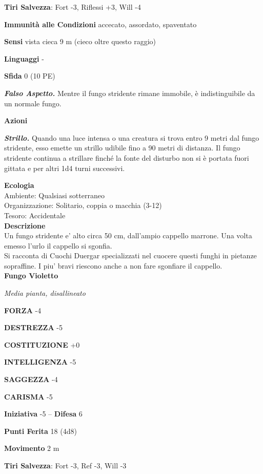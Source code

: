 \begin{multicols}{2}
\textbf{Tiri Salvezza}: Fort -3, Riflessi +3, Will -4

\textbf{Immunità alle Condizioni} accecato, assordato, spaventato

\textbf{Sensi} vista cieca 9 m (cieco oltre questo raggio)

\textbf{Linguaggi} -

\textbf{Sfida} 0 (10 PE)

\emph{\textbf{Falso Aspetto.}} Mentre il fungo stridente rimane immobile, è indistinguibile da un normale fungo.

\textbf{Azioni}

\emph{\textbf{Strillo.}} Quando una luce intensa o una creatura si trova entro 9 metri dal fungo stridente, esso emette un strillo udibile fino a 90 metri di distanza. Il fungo stridente continua a strillare finché la fonte del disturbo non si è portata fuori gittata e per altri 1d4 turni successivi.

\textbf{Ecologia}\\
Ambiente: Qualsiasi sotterraneo\\
Organizzazione: Solitario, coppia o macchia (3-12)\\
Tesoro: Accidentale\\
\textbf{Descrizione}\\
Un fungo stridente e' alto circa 50 cm, dall'ampio cappello marrone. Una volta emesso l'urlo il cappello si sgonfia. \\
Si racconta di Cuochi Duergar specializzati nel cuocere questi funghi in pietanze sopraffine.
I piu' bravi riescono anche a non fare sgonfiare il cappello.\\


\medskip{}\textbf{Fungo Violetto}

\emph{Media pianta, disallineato}

\textbf{FORZA} -4

\textbf{DESTREZZA} -5

\textbf{COSTITUZIONE} +0

\textbf{INTELLIGENZA} -5

\textbf{SAGGEZZA} -4

\textbf{CARISMA} -5

\textbf{Iniziativa} -5 -- \textbf{Difesa} 6

\textbf{Punti Ferita} 18 (4d8)

\textbf{Movimento} 2 m

\textbf{Tiri Salvezza}: Fort -3, Ref -3, Will -3


\end{multicols}
